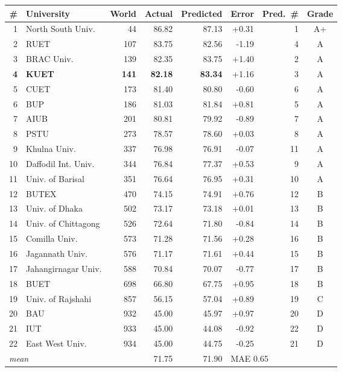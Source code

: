 \begin{tabular}{rlrrrrrc}
\toprule
\textbf{\#} & \textbf{University} & \textbf{World} & \textbf{Actual} & \textbf{Predicted} & \textbf{Error} & \textbf{Pred.\ \#} & \textbf{Grade} \\
\midrule
1 & North South Univ. & 44 & 86.82 & 87.13 & +0.31 & 1 & A+ \\
2 & RUET & 107 & 83.75 & 82.56 & -1.19 & 4 & A \\
3 & BRAC Univ. & 139 & 82.35 & 83.75 & +1.40 & 2 & A \\
\textbf{4} & \textbf{KUET} & \textbf{141} & \textbf{82.18} & \textbf{83.34} & +1.16 & 3 & A \\
5 & CUET & 173 & 81.40 & 80.80 & -0.60 & 6 & A \\
6 & BUP & 186 & 81.03 & 81.84 & +0.81 & 5 & A \\
7 & AIUB & 201 & 80.81 & 79.92 & -0.89 & 7 & A \\
8 & PSTU & 273 & 78.57 & 78.60 & +0.03 & 8 & A \\
9 & Khulna Univ. & 337 & 76.98 & 76.91 & -0.07 & 11 & A \\
10 & Daffodil Int. Univ. & 344 & 76.84 & 77.37 & +0.53 & 9 & A \\
11 & Univ. of Barisal & 351 & 76.64 & 76.95 & +0.31 & 10 & A \\
12 & BUTEX & 470 & 74.15 & 74.91 & +0.76 & 12 & B \\
13 & Univ. of Dhaka & 502 & 73.17 & 73.18 & +0.01 & 13 & B \\
14 & Univ. of Chittagong & 526 & 72.64 & 71.80 & -0.84 & 14 & B \\
15 & Comilla Univ. & 573 & 71.28 & 71.56 & +0.28 & 16 & B \\
16 & Jagannath Univ. & 576 & 71.17 & 71.61 & +0.44 & 15 & B \\
17 & Jahangirnagar Univ. & 588 & 70.84 & 70.07 & -0.77 & 17 & B \\
18 & BUET & 698 & 66.80 & 67.75 & +0.95 & 18 & B \\
19 & Univ. of Rajshahi & 857 & 56.15 & 57.04 & +0.89 & 19 & C \\
20 & BAU & 932 & 45.00 & 45.97 & +0.97 & 20 & D \\
21 & IUT & 933 & 45.00 & 44.08 & -0.92 & 22 & D \\
22 & East West Univ. & 934 & 45.00 & 44.75 & -0.25 & 21 & D \\
\midrule
\multicolumn{3}{l}{\emph{mean}} & 71.75 & 71.90 & \multicolumn{3}{l}{MAE 0.65} \\
\bottomrule
\end{tabular}
